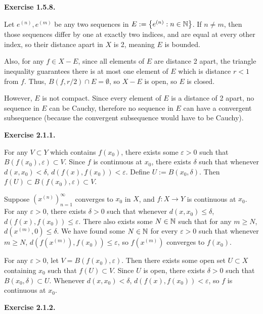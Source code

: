 \documentclass{article}
\begin{document}
\bigskip
\par
\textbf{Exercise 1.5.8.}
\par
Let $e^{(n)}, e^{(m)}$ be any two sequences in $E := \left\{ e^{(n)} : n \in \mathbb{N} \right\}$. If $n \neq m$, then those sequences differ by one at exactly two indices, and are equal at every other index, so their distance apart in $X$ is 2, meaning $E$ is bounded.
\par
Also, for any $f \in X - E$, since all elements of $E$ are distance 2 apart, the triangle inequality guarantees there is at most one element of $E$ which is distance $r < 1$ from $f$. Thus, $B(f, r/2) \cap E = \emptyset$, so $X-E$ is open, so $E$ is closed.
\par
However, $E$ is not compact. Since every element of $E$ is a distance of 2 apart, no sequence in $E$ can be Cauchy, therefore no sequence in $E$ can have a convergent subsequence (because the convergent subsequence would have to be Cauchy).
\bigskip
\par
\textbf{Exercise 2.1.1.}
\par
{} For any $V \subset Y$ which contains $f(x_0)$, there exists some $\varepsilon > 0$ such that $B(f(x_0), \varepsilon) \subset V$. Since $f$ is continuous at $x_0$, there exists $\delta$ such that whenever $d(x, x_0) < \delta$, $d(f(x), f(x_0)) < \varepsilon$. Define $U := B(x_0, \delta)$. Then $f(U) \subset B(f(x_0), \varepsilon) \subset V$.
\par
{} Suppose $ \left( x^{(n)} \right)_{n=1}^\infty$ converges to $x_0$ in $X$, and $f: X \rightarrow Y$ is continuous at $x_0$. For any $\varepsilon > 0$, there exists $\delta > 0$ such that whenever $d(x, x_0) \leq \delta$, $d(f(x), f(x_0)) \leq \varepsilon$. There also exists some $N \in \mathbb{N}$ such that for any $m \geq N$, $d(x^{(m)}, 0) \leq \delta$. We have found some $N \in \mathbb{N}$ for every $\varepsilon > 0$ such that whenever $m \geq N$, $d(f(x^{(m)}), f(x_0)) \leq \varepsilon$, so $f(x^{(m)})$ converges to $f(x_0)$.
\par
{}
\par
{} For any $\varepsilon > 0$, let $V = B(f(x_0), \varepsilon)$. Then there exists some open set $U \subset X$ containing $x_0$ such that $f(U) \subset V$. Since $U$ is open, there exists $\delta > 0$ such that $B(x_0, \delta) \subset U$. Whenever $d(x, x_0) < \delta$, $d(f(x), f(x_0)) < \varepsilon$, so $f$ is continuous at $x_0$.
\bigskip
\par
\textbf{Exercise 2.1.2.}
\end{document}
